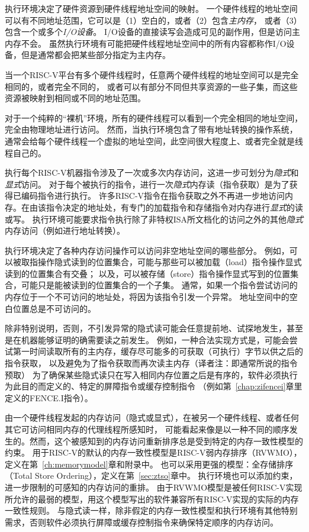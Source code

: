 执行环境决定了硬件资源到硬件线程地址空间的映射。
一个硬件线程的地址空间可以有不同地址范围，它可以是（1）空白的，或者（2）包含{\em 主内存}，
或者（3）包含一个或多个{\em I/O设备}。
I/O设备的直接读写会造成可见的副作用，但是访问主内存不会。
虽然执行环境有可能把硬件线程地址空间中的所有内容都称作I/O设备，但是通常都会把某些部分指定为主内存。

当一个RISC-V平台有多个硬件线程时，任意两个硬件线程的地址空间可以是完全相同的，或者完全不同的，
或者可以有部分不同但共享资源的一些子集，而这些资源被映射到相同或不同的地址范围。

\begin{commentary}

  对于一个纯粹的“裸机”环境，所有的硬件线程可以看到一个完全相同的地址空间，完全由物理地址进行访问。
  然而，当执行环境包含了带有地址转换的操作系统，通常会给每个硬件线程一个虚拟的地址空间，此空间很大程度上、或者完全就是线程自己的。
\end{commentary}

执行每个RISC-V机器指令涉及了一次或多次内存访问，这进一步可划分为{\em 隐式}和{\em 显式}访问。
对于每个被执行的指令，进行一次{\em 隐式}内存读（指令获取）是为了获得已编码指令进行执行。
许多RISC-V指令在指令获取之外不再进一步地访问内存。在由该指令决定的地址处，有专门的加载指令和存储指令对内存进行{\em 显式}的读或写。
执行环境可能要求指令执行除了非特权ISA所文档化的访问之外的其他{\em 隐式}内存访问（例如进行地址转换）。

执行环境决定了各种内存访问操作可以访问非空地址空间的哪些部分。
例如，可以被取指操作隐式读到的位置集合，可能与那些可以被加载（load）指令操作显式读到的位置集合有交叠；
以及，可以被存储（store）指令操作显式写到的位置集合，可能只是能被读到的位置集合的一个子集。
通常，如果一个指令尝试访问的内存位于一个不可访问的地址处，将因为该指令引发一个异常。
地址空间中的空白位置总是不可访问的。

除非特别说明，否则，不引发异常的隐式读可能会任意提前地、试探地发生，甚至是在机器能够证明的确需要读之前发生。
例如，一种合法实现方式是，可能会尝试第一时间读取所有的主内存，缓存尽可能多的可获取（可执行）字节以供之后的指令获取，
以及避免为了指令获取而再次读主内存（译者注：即通常所说的指令预取）
为了确保某些隐式读只在写入相同内存位置之后是有序的，软件必须执行为此目的而定义的、特定的屏障指令或缓存控制指令
（例如第~\ref{chap:zifencei}章里定义的FENCE.I指令）。

由一个硬件线程发起的内存访问（隐式或显式），在被另一个硬件线程、或者任何其它可访问相同内存的代理线程所感知时，
可能看起来像是以一种不同的顺序发生的。然而，这个被感知到的内存访问重新排序总是受到特定的内存一致性模型的约束。
用于RISC-V的默认的内存一致性模型是RISC-V弱内存排序（RVWMO），定义在第~\ref{ch:memorymodel}章和附录中。
也可以采用更强的模型：全存储排序（Total Store Ordering），定义在第~\ref{sec:ztso}章中。
执行环境也可以添加约束，进一步限制的可感知的内存访问的重排。
由于RVWMO模型是被任何RISC-V实现所允许的最弱的模型，用这个模型写出的软件兼容所有RISC-V实现的实际的内存一致性规则。
与隐式读一样，除非假定的内存一致性模型和执行环境有其他特别需求，否则软件必须执行屏障或缓存控制指令来确保特定顺序的内存访问。

